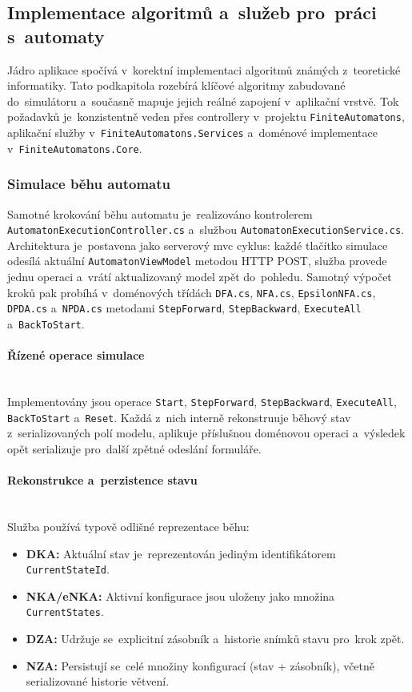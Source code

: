 \documentclass[
  master,
  program=ainfvs,
  printversion,
  figures=false,
  tables=false,
  glossaries,
  index
]{kidiplom}
\begin{document}
\subsection{Implementace algoritmů a~služeb pro~práci s~automaty} 
Jádro aplikace spočívá v~korektní implementaci algoritmů známých z~teoretické informatiky. Tato podkapitola rozebírá klíčové algoritmy zabudované do~simulátoru a~současně mapuje jejich reálné zapojení v~aplikační vrstvě. Tok požadavků je~konzistentně veden přes controllery v~projektu \texttt{FiniteAutomatons}, aplikační služby v~\texttt{FiniteAutomatons.Services} a~doménové implementace v~\texttt{FiniteAutomatons.Core}.

\subsubsection{Simulace běhu automatu}

Samotné krokování běhu automatu je~realizováno kontrolerem \texttt{Automaton\-Exe\-cu\-ti\-on\-Controller.cs} a~službou \texttt{Automaton\-Execution\-Service.cs}.\- Architektura je~postavena jako serverový \gls{mvc} cyklus: každé tlačítko simulace odesílá aktuální \texttt{Automaton\-View\-Model} metodou HTTP POST, služba provede jednu operaci a~vrátí aktualizovaný model zpět do~pohledu. Samotný výpočet kroků pak probíhá v~doménových třídách \texttt{DFA.cs}, \texttt{NFA.cs}, \texttt{Epsilon\-NFA\-.cs}, \texttt{DPDA.cs} a~\texttt{NPDA.cs} metodami \texttt{Step\-Forward}, \texttt{Step\-Backward}, \texttt{Execute\-All} a~\texttt{BackToStart}.

\paragraph{Řízené operace simulace} \mbox{} \\
Implementovány jsou operace \texttt{Start}, \texttt{StepForward}, \texttt{StepBackward}, \texttt{Exe\-cu\-te\-All}, \texttt{BackToStart} a~\texttt{Reset}. Každá z~nich interně rekonstruuje běhový stav z~serializovaných polí modelu, aplikuje příslušnou doménovou operaci a~výsledek opět serializuje pro~další zpětné odeslání formuláře.

\paragraph{Rekonstrukce a~perzistence stavu} \mbox{} \\
Služba používá typově odlišné reprezentace běhu:

\begin{itemize}
    \item \textbf{\gls{DKA}:} Aktuální stav je~reprezentován jediným identifikátorem \texttt{Current\-State\-Id}.
    \item \textbf{\gls{NKA}/\gls{eNKA}:} Aktivní konfigurace jsou uloženy jako množina \texttt{Current\-States}.
    \item \textbf{\gls{DZA}:} Udržuje se~explicitní zásobník a~historie snímků stavu pro~krok zpět.
    \item \textbf{\gls{NZA}:} Persistují se~celé množiny konfigurací (stav + zásobník), včetně serializované historie větvení.
\end{itemize}
\end{document}
